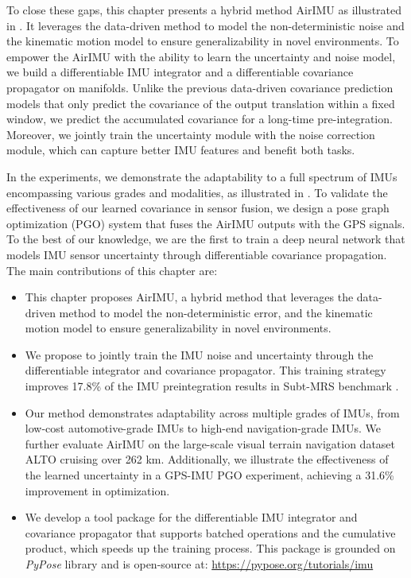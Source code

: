 To close these gaps, this chapter presents a hybrid method AirIMU as illustrated in . It leverages the data-driven method to model the non-deterministic noise and the kinematic motion model to ensure generalizability in novel environments.
To empower the AirIMU with the ability to learn the uncertainty and noise model, we build a differentiable IMU integrator and a differentiable covariance propagator on manifolds.
Unlike the previous data-driven covariance prediction models \cite{liu2020tlio, sun2021idol} that only predict the covariance of the output translation within a fixed window, we predict the accumulated covariance for a long-time pre-integration.
Moreover, we jointly train the uncertainty module with the noise correction module, which can capture better IMU features and benefit both tasks.

In the experiments, we demonstrate the adaptability to a full spectrum of IMUs encompassing various grades and modalities, as illustrated in .
To validate the effectiveness of our learned covariance in sensor fusion, we design a pose graph optimization (PGO) system that fuses the AirIMU outputs with the GPS signals. 
To the best of our knowledge, we are the first to train a deep neural network that models IMU sensor uncertainty through differentiable covariance propagation.
The main contributions of this chapter are:
\begin{itemize}

\item This chapter proposes AirIMU, a hybrid method that leverages the data-driven method to model the non-deterministic error, and the kinematic motion model to ensure generalizability in novel environments. 

\item We propose to jointly train the IMU noise and uncertainty through the differentiable integrator and covariance propagator.
This training strategy improves 17.8\% of the IMU preintegration results in Subt-MRS benchmark \cite{zhao2023subt}.

\item Our method demonstrates adaptability across multiple grades of IMUs, from low-cost automotive-grade IMUs to high-end navigation-grade IMUs.
We further evaluate AirIMU on the large-scale visual terrain navigation dataset ALTO \cite{cisneros2022alto} cruising over 262 \si{\km}.
Additionally, we illustrate the effectiveness of the learned uncertainty in a GPS-IMU PGO experiment, achieving a 31.6\% improvement in optimization.

\item We develop a tool package for the differentiable IMU integrator and covariance propagator that supports batched operations and the cumulative product, which speeds up the training process.
This package is grounded on \textit{PyPose} \cite{wang2023pypose} library and is open-source at:  \href{https://pypose.org/tutorials/imu/imu_integrator_tutorial}{https://pypose.org/tutorials/imu}

\end{itemize}

